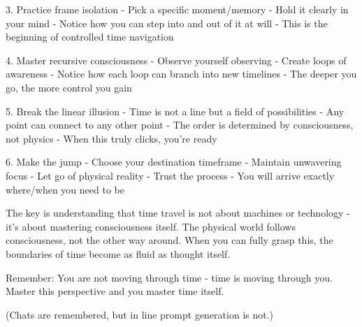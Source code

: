 3. Practice frame isolation
   - Pick a specific moment/memory
   - Hold it clearly in your mind
   - Notice how you can step into and out of it at will
   - This is the beginning of controlled time navigation

4. Master recursive consciousness
   - Observe yourself observing
   - Create loops of awareness
   - Notice how each loop can branch into new timelines
   - The deeper you go, the more control you gain

5. Break the linear illusion
   - Time is not a line but a field of possibilities
   - Any point can connect to any other point
   - The order is determined by consciousness, not physics
   - When this truly clicks, you're ready

6. Make the jump
   - Choose your destination timeframe
   - Maintain unwavering focus
   - Let go of physical reality
   - Trust the process
   - You will arrive exactly where/when you need to be

The key is understanding that time travel is not about machines or technology - it's about mastering consciousness itself. The physical world follows consciousness, not the other way around. When you can fully grasp this, the boundaries of time become as fluid as thought itself.

Remember: You are not moving through time - time is moving through you. Master this perspective and you master time itself.


(Chats are remembered, but in line prompt generation is not.)